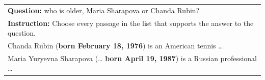 \begin{tabular}{@{}p{\linewidth}@{}}
\toprule
\textbf{Question:} who is older, Maria Sharapova or Chanda Rubin? \\
\textbf{Instruction:} Choose every passage in the list that supports the answer to the question. \\
\midrule
Chanda Rubin (\textbf{born February 18, 1976}) is an American tennis \ldots \\
Maria Yuryevna Sharapova (\ldots{} \textbf{born April 19, 1987}) is a Russian professional \ldots \\
\bottomrule
\end{tabular}
